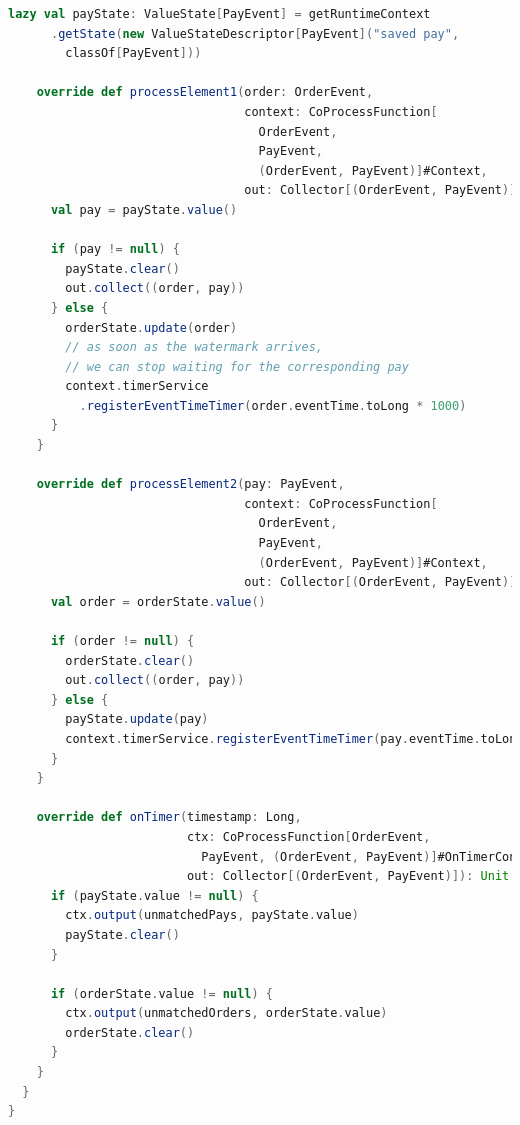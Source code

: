 \documentclass[oneside]{ctexbook}
\begin{document}
\begin{lstlisting}[language=scala]
    lazy val payState: ValueState[PayEvent] = getRuntimeContext
      .getState(new ValueStateDescriptor[PayEvent]("saved pay",
        classOf[PayEvent]))

    override def processElement1(order: OrderEvent,
                                 context: CoProcessFunction[
                                   OrderEvent,
                                   PayEvent,
                                   (OrderEvent, PayEvent)]#Context,
                                 out: Collector[(OrderEvent, PayEvent)]): Unit = {
      val pay = payState.value()

      if (pay != null) {
        payState.clear()
        out.collect((order, pay))
      } else {
        orderState.update(order)
        // as soon as the watermark arrives,
        // we can stop waiting for the corresponding pay
        context.timerService
          .registerEventTimeTimer(order.eventTime.toLong * 1000)
      }
    }

    override def processElement2(pay: PayEvent,
                                 context: CoProcessFunction[
                                   OrderEvent,
                                   PayEvent,
                                   (OrderEvent, PayEvent)]#Context,
                                 out: Collector[(OrderEvent, PayEvent)]): Unit = {
      val order = orderState.value()

      if (order != null) {
        orderState.clear()
        out.collect((order, pay))
      } else {
        payState.update(pay)
        context.timerService.registerEventTimeTimer(pay.eventTime.toLong * 1000)
      }
    }

    override def onTimer(timestamp: Long,
                         ctx: CoProcessFunction[OrderEvent,
                           PayEvent, (OrderEvent, PayEvent)]#OnTimerContext,
                         out: Collector[(OrderEvent, PayEvent)]): Unit = {
      if (payState.value != null) {
        ctx.output(unmatchedPays, payState.value)
        payState.clear()
      }

      if (orderState.value != null) {
        ctx.output(unmatchedOrders, orderState.value)
        orderState.clear()
      }
    }
  }
}
\end{lstlisting}
\end{document}
